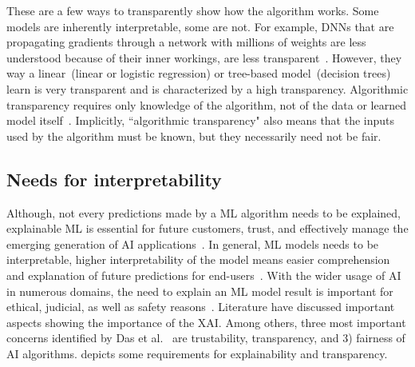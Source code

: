 \hspace*{3.5mm} These are a few ways to transparently show how the algorithm works. Some models are inherently interpretable, some are not. For example, DNNs that are propagating gradients through a network with millions of weights are less understood because of their inner workings, are less transparent~\cite{molnar2019interpretable}. However, they way a linear~(linear or logistic regression) or tree-based model~(decision trees) learn is very transparent and is characterized by a high transparency. Algorithmic transparency requires only knowledge of the algorithm, not of the data or learned model itself~\cite{molnar2019interpretable}. Implicitly, ``algorithmic transparency" also means that the inputs used by the algorithm must be known, but they necessarily need not be fair. 

\subsection{Needs for interpretability}
Although, not every predictions made by a ML algorithm needs to be explained, explainable ML is essential for future customers, trust, and effectively manage the emerging generation of AI applications~\cite{das2020opportunities}. In general, ML models needs to be interpretable, higher interpretability of the model means easier comprehension and explanation of future predictions for end-users~\cite{stiglic2020interpretability}. With the wider usage of AI in numerous domains, the need to explain an ML model result is important for ethical, judicial, as well as safety reasons~\cite{das2020opportunities}. Literature have discussed important aspects showing the importance of the XAI. Among others, three most important concerns identified by Das et al.~\cite{das2020opportunities} are trustability, transparency, and 3) fairness of AI algorithms.  depicts some requirements for explainability and transparency. 

